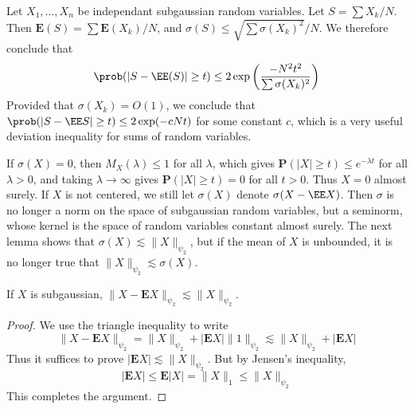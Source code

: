 \begin{example}
    Let $X_1, \dots, X_n$ be independant subgaussian random variables. Let $S = \sum X_k/N$. Then $\mathbf{E}(S) = \sum \mathbf{E}(X_k) / N$, and $\sigma(S) \leq \sqrt{\sum \sigma(X_k)^2} / N$. We therefore conclude that
    \[ \prob(|S - \EE(S)| \geq t) \leq 2 \exp \left( \frac{- N^2 t^2}{\sum \sigma(X_k)^2} \right) \]
    Provided that $\sigma(X_k) = O(1)$, we conclude that $\prob(|S - \EE S| \geq t) \leq 2 \exp(-cNt)$ for some constant $c$, which is a very useful deviation inequality for sums of random variables.
\end{example}

If $\sigma(X) = 0$, then $M_X(\lambda) \leq 1$ for all $\lambda$, which gives $\mathbf{P}(|X| \geq t) \leq e^{-\lambda t}$ for all $\lambda > 0$, and taking $\lambda \to \infty$ gives $\mathbf{P}(|X| \geq t) = 0$ for all $t > 0$. Thus $X = 0$ almost surely. If $X$ is not centered, we still let $\sigma(X)$ denote $\sigma(X - \EE X)$. Then $\sigma$ is no longer a norm on the space of subgaussian random variables, but a seminorm, whose kernel is the space of random variables constant almost surely. The next lemma shows that $\sigma(X) \lesssim \| X \|_{\psi_2}$, but if the mean of $X$ is unbounded, it is no longer true that $\| X \|_{\psi_2} \lesssim \sigma(X)$.

\begin{lemma}[Centering]
    If $X$ is subgaussian, $\| X - \mathbf{E} X \|_{\psi_2} \lesssim \| X \|_{\psi_2}$.
\end{lemma}
\begin{proof}
    We use the triangle inequality to write
    \[ \| X - \mathbf{E }X \|_{\psi_2} = \| X \|_{\psi_2} + | \mathbf{E} X | \| 1 \|_{\psi_2} \lesssim \| X \|_{\psi_2} + | \mathbf{E} X | \]
    Thus it suffices to prove $|\mathbf{E} X | \lesssim \| X \|_{\psi_2}$. But by Jensen's inequality,
    \[ |\mathbf{E} X| \leq \mathbf{E} |X| = \| X \|_1 \leq \| X \|_{\psi_2} \]
    This completes the argument.
\end{proof}

